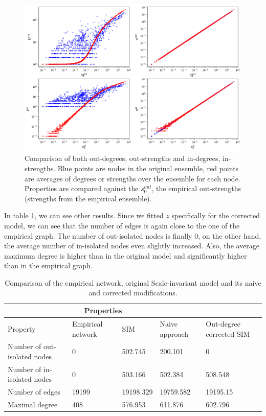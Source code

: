 \begin{figure}[!ht]
    \centering
    \includegraphics[scale=0.5]{../img/corrected_naive/degrees_strengths_rec.png}
    \caption{Comparison of both out-degrees, out-strengths and in-degrees, in-strengths. Blue points are nodes in the original ensemble, red points are averages of degrees or strengths over the ensemble for each node. Properties are compared against the $s_0^{out}$, the empirical out-strengths (strengths from the empirical ensemble).}
    \label{fig:degrees_strengths_rec_corrected_naive}
\end{figure}

In table \ref*{table:comparison_1}, we can see other results. Since we fitted $z$ specifically for the corrected model, we can see that the number of edges is again close to the one of the empirical graph. The number of out-isolated nodes is finally 0, on the other hand, the average number of in-isolated nodes even slightly increased. Also, the average maximum degree is higher than in the original model and significantly higher than in the empirical graph.

\begin{table}
\centering
\begin{tabular}{ |p{3cm}||p{2cm}|p{2cm}|p{2cm}|p{2cm}|  }
 \hline
 \multicolumn{4}{|c|}{Properties} \\
 \hline
 Property & Empirical network & SIM & Naive approach & Out-degree corrected SIM \\
 \hline
 Number of out-isolated nodes   & 0    &502.745&   200.101 & 0\\
 Number of in-isolated nodes   & 0    &503.166&   502.384 & 508.548\\
 Number of edges&   19199  & 19198.329  &19759.582 & 19195.15\\
 Maximal degree & 408 & 576.953&  611.876 & 602.796\\
 \hline
\end{tabular}
\caption{Comparison of the empirical network, original Scale-invariant model and its naive and corrected modifications.}
\label{table:comparison_1}
\end{table}

